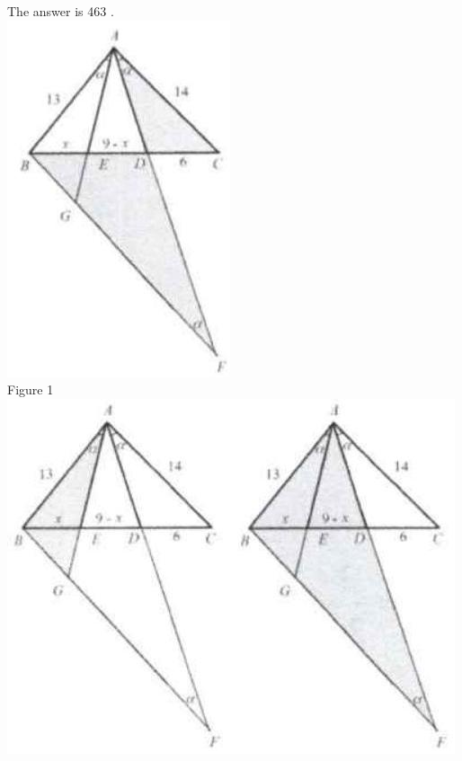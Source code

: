 \documentclass[10pt]{article}
\begin{document}
The answer is 463 .\\
\includegraphics[max width=\textwidth, center]{2025_04_17_97bc1f7e44d93c271a88g-121(1)}\\
Figure 1\\
\includegraphics[max width=\textwidth, center]{2025_04_17_97bc1f7e44d93c271a88g-121(3)}\\
\end{document}
